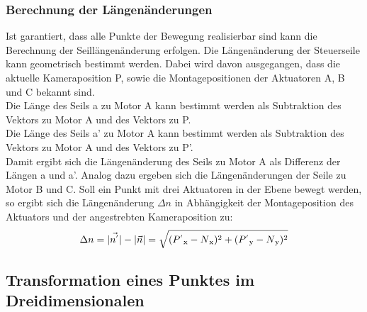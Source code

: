 \documentclass[a4paper, 12pt]{article}
\begin{document}
			\subsubsection{Berechnung der Längenänderungen}
			Ist garantiert, dass alle Punkte der Bewegung realisierbar sind kann die Berechnung der Seillängenänderung erfolgen. 
			Die Längenänderung der Steuerseile kann geometrisch bestimmt werden.
			Dabei wird davon ausgegangen, dass die aktuelle Kameraposition P, sowie die Montagepositionen der Aktuatoren A, B und C bekannt sind.\\
			Die Länge des Seils a zu Motor A kann bestimmt werden als Subtraktion des Vektors zu Motor A und des Vektors zu P.\\
			Die Länge des Seils a' zu Motor A kann bestimmt werden als Subtraktion des Vektors zu Motor A und des Vektors zu P'.\\
			Damit ergibt sich die Längenänderung des Seils zu Motor A als Differenz der Längen a und a'.
			Analog dazu ergeben sich die Längenänderungen der Seile zu Motor B und C.
			Soll ein Punkt mit drei Aktuatoren in der Ebene bewegt werden,
			so ergibt sich die Längenänderung $\Delta n$ in Abhängigkeit der Montageposition des Aktuators und der angestrebten Kameraposition zu:
			\begin{align}
				\Delta n =
				|\vec{n^{'}}|-|\vec{n}|=
				\sqrt{
				(P^{'}\textsubscript{x}-N\textsubscript{x})^2+
				(P^{'}\textsubscript{y}-N\textsubscript{y})^2
				}
			\end{align}
		\subsection{Transformation eines Punktes im Dreidimensionalen}	
\end{document}
